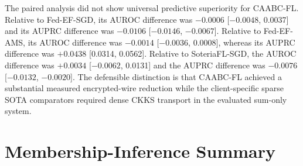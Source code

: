 \begin{table}[htbp]
    \centering
    \caption{Same-protocol comparison with reproduced communication-efficient methods}
    \label{tab:sota-results-appendix}
\end{table}

The paired analysis did not show universal predictive superiority for CAABC-FL. Relative to Fed-EF-SGD, its AUROC difference was $-0.0006$ [$-0.0048$, 0.0037] and its AUPRC difference was $-0.0106$ [$-0.0146$, $-0.0067$]. Relative to Fed-EF-AMS, its AUROC difference was $-0.0014$ [$-0.0036$, 0.0008], whereas its AUPRC difference was $+0.0438$ [0.0314, 0.0562]. Relative to SoteriaFL-SGD, the AUROC difference was $+0.0034$ [$-0.0062$, 0.0131] and the AUPRC difference was $-0.0076$ [$-0.0132$, $-0.0020$]. The defensible distinction is that CAABC-FL achieved a substantial measured encrypted-wire reduction while the client-specific sparse SOTA comparators required dense CKKS transport in the evaluated sum-only system.

\section{Membership-Inference Summary}
\label{appsec:membership-full}

